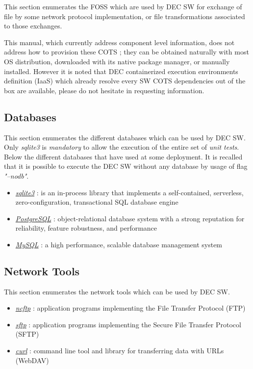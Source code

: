 \documentclass[dec_sum_main.tex]{subfiles}
\begin{document}
This section enumerates the FOSS which are used by DEC SW for exchange of file by some network protocol implementation, or file transformations associated to those exchanges. \par\noindent


\par
\noindent
This manual, which currently address component level information, does not address how to provision these COTS ; they can be obtained naturally with most OS distribution, downloaded with its native package manager, or manually installed. However it is noted that DEC containerized execution environments definition (IaaS) which already resolve every SW COTS dependencies out of the box are available, please do not hesitate in requesting information.

\subsection{Databases}
This section enumerates the different databases which can be used by DEC SW. Only \textit{sqlite3} is \textit{mandatory} to allow the execution of the entire set of \textit{unit tests}. Below the different databases that have used at some deployment. It is recalled that it is possible to execute the DEC SW without any database by usage of flag \textit{"--nodb"}.
\par
\begin{itemize}
	\item \href{https://www.sqlite.org}{\textit{sqlite3}} : is an in-process library that implements a self-contained, serverless, zero-configuration, transactional SQL database engine
	\item \href{https://www.postgresql.org/}{\textit{PostgreSQL}} : object-relational database system with a strong reputation for reliability, feature robustness, and performance
	\item \href{https://www.mysql.com/}{\textit{MySQL}} : a high performance, scalable database management system
\end{itemize}

\subsection{Network Tools}
This section enumerates the network tools which can be used by DEC SW.
\par
\begin{itemize}
	\item \href{https://www.ncftp.com}{\textit{ncftp}} : application programs implementing the File Transfer Protocol (FTP)
	\item \href{https://www.openssh.com}{\textit{sftp}} : application programs implementing the Secure File Transfer Protocol (SFTP)
	\item \href{https://curl.haxx.se}{\textit{curl}} : command line tool and library for transferring data with URLs (WebDAV)
\end{itemize}
\end{document}
